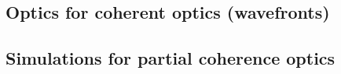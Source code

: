 \documentclass{aip-cp}
\begin{document}
\subsection{Optics for coherent optics (wavefronts)}

\subsection{Simulations for partial coherence optics}


% 
% 
% 
% 
\end{document}
